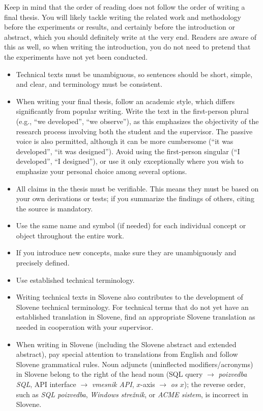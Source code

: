 \documentclass[9pt]{style/friteza}
\begin{document}
Keep in mind that the order of reading does not follow the order of writing a final thesis. You will likely tackle writing the related work and methodology before the experiments or results, and certainly before the introduction or abstract, which you should definitely write at the very end. Readers are aware of this as well, so when writing the introduction, you do not need to pretend that the experiments have not yet been conducted.

\begin{itemize}
    \item Technical texts must be unambiguous, so sentences should be short, simple, and clear, and terminology must be consistent. 
    \item When writing your final thesis, follow an academic style, which differs significantly from popular writing. Write the text in the first-person plural (e.g., \enquote{we developed}, \enquote{we observe}), as this emphasizes the objectivity of the research process involving both the student and the supervisor. The passive voice is also permitted, although it can be more cumbersome (\enquote{it was developed}, \enquote{it was designed}). Avoid using the first-person singular (\enquote{I developed}, \enquote{I designed}), or use it only exceptionally where you wish to emphasize your personal choice among several options. 
    \item All claims in the thesis must be verifiable. This means they must be based on your own derivations or tests; if you summarize the findings of others, citing the source is mandatory.
    \item Use the same name and symbol (if needed) for each individual concept or object throughout the entire work. 
    \item If you introduce new concepts, make sure they are unambiguously and precisely defined. 
    \item Use established technical terminology. 
    \item Writing technical texts in Slovene also contributes to the development of Slovene technical terminology. For technical terms that do not yet have an established translation in Slovene, find an appropriate Slovene translation as needed in cooperation with your supervisor. 
    \item When writing in Slovene (including the Slovene abstract and extended abstract), pay special attention to translations from English and follow Slovene grammatical rules. Noun adjuncts (uninflected modifiers/acronyms) in Slovene belong to the right of the head noun (SQL query $\rightarrow$ \textit{poizvedba SQL}, API interface $\rightarrow$ \textit{vmesnik API}, $x$-axis $\rightarrow$ \textit{os $x$}); the reverse order, such as \textit{SQL poizvedba}, \textit{Windows strežnik}, or \textit{ACME sistem}, is incorrect in Slovene.
\end{itemize}
\end{document}

